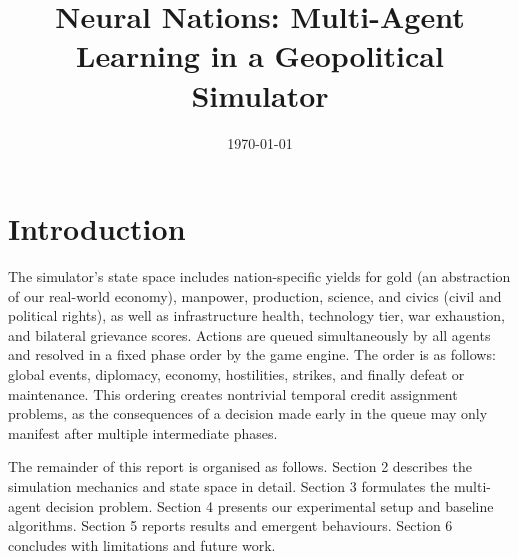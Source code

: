 \documentclass[11pt, a4paper, onecolumn]{article} %
\title{Neural Nations: 
Multi-Agent Learning in a Geopolitical Simulator}
\author{
	\authorstyle{Muhammad A'qil bin Mohd Khalid, Huang Zhuoyan Celeste, Wang Yucheng, Selvaraju Nandita}
}
\begin{document}
\maketitle

\date{\today} 

\thispagestyle{firstpage} 




\section{Introduction}

The simulator's state space includes nation-specific yields for gold (an abstraction of our real-world economy), manpower, production, science, and civics (civil and political rights), as well as infrastructure health, technology tier, war exhaustion, and bilateral grievance scores. Actions are queued simultaneously by all agents and resolved in a fixed phase order by the game engine. The order is as follows: global events, diplomacy, economy, hostilities, strikes, and finally defeat or maintenance. This ordering creates nontrivial temporal credit assignment problems, as the consequences of a decision made early in the queue may only manifest after multiple intermediate phases.

The remainder of this report is organised as follows. Section 2 describes the simulation mechanics and state space in detail. Section 3 formulates the multi-agent decision problem. Section 4 presents our experimental setup and baseline algorithms. Section 5 reports results and emergent behaviours. Section 6 concludes with limitations and future work.
\end{document}
